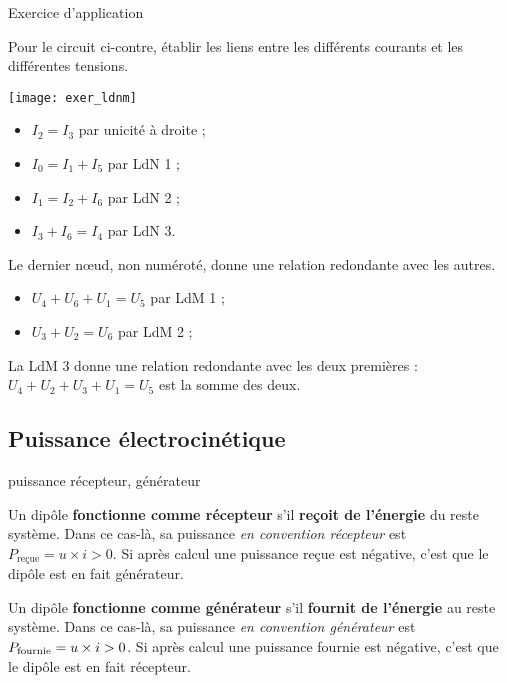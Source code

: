 \documentclass[../main/main.tex]{subfiles}
\begin{document}
\begin{NCcexe}[breakable]{Exercice d'application}

    \begin{minipage}{0.30\linewidth}
        Pour le circuit ci-contre, établir les liens entre les différents
        courants et les différentes tensions.
    \end{minipage}
    \begin{minipage}{0.70\linewidth}
        \texttt{[image: exer\_ldnm]}
    \end{minipage}
    \tcblower
    \begin{minipage}{0.47\linewidth}
        \begin{itemize}
            \item $I_2 = I_3$ par unicité à droite ;
            \item $I_0 = I_1 + I_5$ par LdN 1 ;
            \item $I_1 = I_2 + I_6$ par LdN 2 ;
            \item $I_3 + I_6 = I_4$ par LdN 3.
        \end{itemize}
        Le dernier nœud, non numéroté, donne une relation redondante avec les
        autres.
    \end{minipage}
    \hfill
    \begin{minipage}{0.47\linewidth}
        \begin{itemize}
            \item $U_4 + U_6 + U_1 = U_5$ par LdM 1 ;
            \item $U_3 + U_2 = U_6$ par LdM 2 ;
        \end{itemize}
        La LdM 3 donne une relation redondante avec les deux premières : $U_4
        + U_2 + U_3 + U_1 = U_5$ est la somme des deux.
    \end{minipage}
\end{NCcexe}

\subsection{Puissance électrocinétique}

\begin{defi}[label=def:puissance]{{puissance récepteur, générateur}}

    Un dipôle \textbf{fonctionne comme récepteur} s'il \textbf{reçoit de
    l'énergie} du reste système. Dans ce cas-là, sa puissance \textit{en
    convention récepteur} est $P_{\text{reçue}} = u\times i > 0$. Si après
    calcul une puissance reçue est négative, c'est que le dipôle est en fait
    générateur. \tcblower

    Un dipôle \textbf{fonctionne comme générateur} s'il \textbf{fournit de
    l'énergie} au reste système. Dans ce cas-là, sa puissance \textit{en
    convention générateur} est $P_{\rm fournie} = u\times i > 0$. Si après
    calcul une puissance fournie est négative, c'est que le dipôle est en fait
    récepteur.
    
\end{defi}
\end{document}
